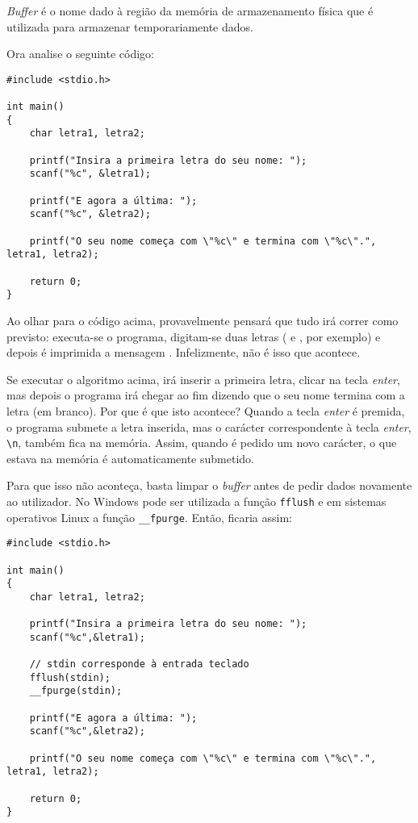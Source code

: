 \begin{defi}
\textit{Buffer} é o nome dado à região da memória de armazenamento física que é utilizada para armazenar temporariamente dados.
\end{defi}

Ora analise o seguinte código:

\begin{lstlisting}
#include <stdio.h>
 
int main()
{   
    char letra1, letra2;
 
    printf("Insira a primeira letra do seu nome: ");
    scanf("%c", &letra1);
 
    printf("E agora a última: ");
    scanf("%c", &letra2);
 
    printf("O seu nome começa com \"%c\" e termina com \"%c\".", letra1, letra2);
 
    return 0;
}
\end{lstlisting}

Ao olhar para o código acima, provavelmente pensará que tudo irá correr como previsto: executa-se o programa, digitam-se duas letras ( e , por exemplo) e depois é imprimida a mensagem . Infelizmente, não é isso que acontece.

Se executar o algoritmo acima, irá inserir a primeira letra, clicar na tecla \textit{enter}, mas depois o programa irá chegar ao fim dizendo que o seu nome termina com a letra \quotes{} (em branco). Por que é que isto acontece? Quando a tecla \textit{enter} é premida, o programa submete a letra inserida, mas o carácter correspondente à tecla \textit{enter}, \texttt{\textbackslash n}, também fica na memória. Assim, quando é pedido um novo carácter, o que estava na memória é automaticamente submetido.

Para que isso não aconteça, basta limpar o \textit{buffer} antes de pedir dados novamente ao utilizador. No Windows pode ser utilizada a função \texttt{fflush} e em sistemas operativos Linux a função \texttt{\_\_fpurge}. Então, ficaria assim:

\begin{lstlisting}
#include <stdio.h>
 
int main()
{   
    char letra1, letra2;
 
    printf("Insira a primeira letra do seu nome: ");
    scanf("%c",&letra1);
 	
 	// stdin corresponde à entrada teclado
    fflush(stdin);
    __fpurge(stdin);
 
    printf("E agora a última: ");
    scanf("%c",&letra2);
 
    printf("O seu nome começa com \"%c\" e termina com \"%c\".", letra1, letra2);
 
    return 0;
}
\end{lstlisting}

